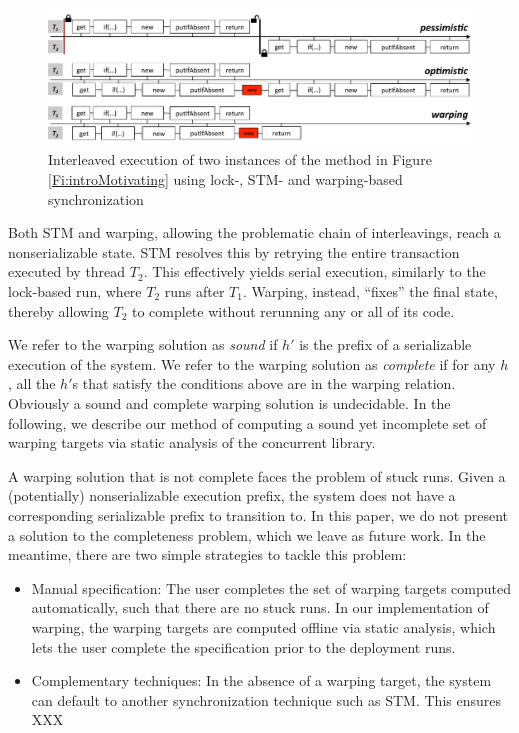 \begin{figure}
	\begin{center}
	\includegraphics[width=\textwidth]{OverviewSlide.pdf}
	\end{center}
	\caption{\label{Fi:motivatingOverview}Interleaved execution of two instances of the method in Figure \ref{Fi:introMotivating} using lock-, STM- and warping-based synchronization}
\end{figure}

Both STM and warping, allowing the problematic chain of interleavings, reach a nonserializable state. STM resolves this by retrying the entire transaction executed by thread $T_2$. This effectively yields serial execution, similarly to the lock-based run, where $T_2$ runs after $T_1$. Warping, instead, ``fixes'' the final state, thereby allowing $T_2$ to complete without rerunning any or all of its code.

We refer to the warping solution as \emph{sound} if $h'$ is the prefix of a serializable execution of the system. We refer to the warping solution as \emph{complete} if for any $h$, all the $h'$s that satisfy the conditions above are in the warping relation. Obviously a sound and complete warping solution is undecidable. In the following, we describe our method of computing a sound yet incomplete set of warping targets via static analysis of the concurrent library.

A warping solution that is not complete faces the problem of stuck runs. Given a (potentially) nonserializable execution prefix, the system does not have a corresponding serializable prefix to transition to. In this paper, we do not present a solution to the completeness problem, which we leave as future work. In the meantime, there are two simple strategies to tackle this problem:
\begin{itemize}
	\item Manual specification: The user completes the set of warping targets computed automatically, such that there are no stuck runs. In our implementation of warping, the warping targets are computed offline via static analysis, which lets the user complete the specification prior to the deployment runs.
	\item Complementary techniques: In the absence of a warping target, the system can default to another synchronization technique such as STM. This ensures XXX
\end{itemize}


